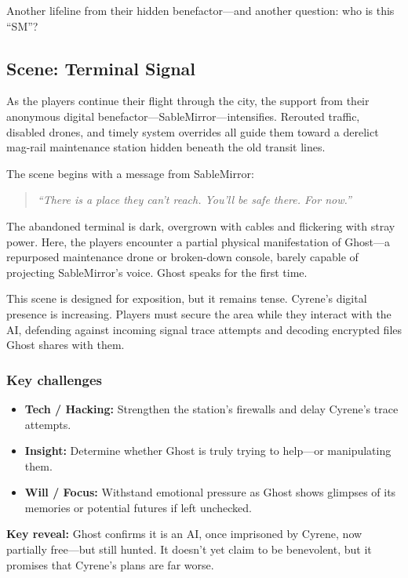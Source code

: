 Another lifeline from their hidden benefactor—and another question: who is this “SM”?


\subsection*{Scene: Terminal Signal}

As the players continue their flight through the city, the support from their anonymous digital benefactor—SableMirror—intensifies. Rerouted traffic, disabled drones, and timely system overrides all guide them toward a derelict mag-rail maintenance station hidden beneath the old transit lines.

The scene begins with a message from SableMirror:
\vspace{0.5\baselineskip}
\begin{quote}
\textit{“There is a place they can’t reach. You’ll be safe there. For now.”}
\end{quote}
\vspace{0.5\baselineskip}

The abandoned terminal is dark, overgrown with cables and flickering with stray power. Here, the players encounter a partial physical manifestation of Ghost—a repurposed maintenance drone or broken-down console, barely capable of projecting SableMirror’s voice. Ghost speaks for the first time.

This scene is designed for exposition, but it remains tense. Cyrene’s digital presence is increasing. Players must secure the area while they interact with the AI, defending against incoming signal trace attempts and decoding encrypted files Ghost shares with them.

\subsubsection{Key challenges}
\begin{itemize}
    \item \textbf{Tech / Hacking:} Strengthen the station’s firewalls and delay Cyrene’s trace attempts.
    \item \textbf{Insight:} Determine whether Ghost is truly trying to help—or manipulating them.
    \item \textbf{Will / Focus:} Withstand emotional pressure as Ghost shows glimpses of its memories or potential futures if left unchecked.
\end{itemize}

\textbf{Key reveal:} Ghost confirms it is an AI, once imprisoned by Cyrene, now partially free—but still hunted. It doesn’t yet claim to be benevolent, but it promises that Cyrene’s plans are far worse.

